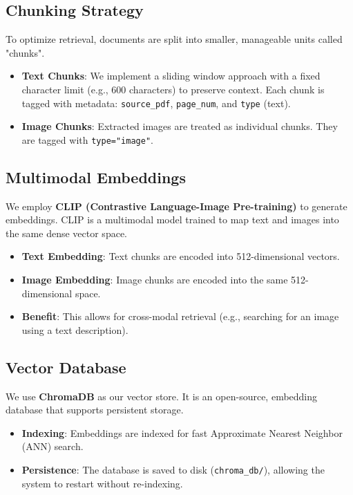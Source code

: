 \documentclass[runningheads]{llncs}
\begin{document}
\subsection{Chunking Strategy}
To optimize retrieval, documents are split into smaller, manageable units called "chunks".
\begin{itemize}
    \item \textbf{Text Chunks}: We implement a sliding window approach with a fixed character limit (e.g., 600 characters) to preserve context. Each chunk is tagged with metadata: \texttt{source\_pdf}, \texttt{page\_num}, and \texttt{type} (text).
    \item \textbf{Image Chunks}: Extracted images are treated as individual chunks. They are tagged with \texttt{type="image"}.
\end{itemize}

\subsection{Multimodal Embeddings}
We employ \textbf{CLIP (Contrastive Language-Image Pre-training)} to generate embeddings. CLIP is a multimodal model trained to map text and images into the same dense vector space.
\begin{itemize}
    \item \textbf{Text Embedding}: Text chunks are encoded into 512-dimensional vectors.
    \item \textbf{Image Embedding}: Image chunks are encoded into the same 512-dimensional space.
    \item \textbf{Benefit}: This allows for cross-modal retrieval (e.g., searching for an image using a text description).
\end{itemize}

\subsection{Vector Database}
We use \textbf{ChromaDB} as our vector store. It is an open-source, embedding database that supports persistent storage.
\begin{itemize}
    \item \textbf{Indexing}: Embeddings are indexed for fast Approximate Nearest Neighbor (ANN) search.
    \item \textbf{Persistence}: The database is saved to disk (\texttt{chroma\_db/}), allowing the system to restart without re-indexing.
\end{itemize}
\end{document}
